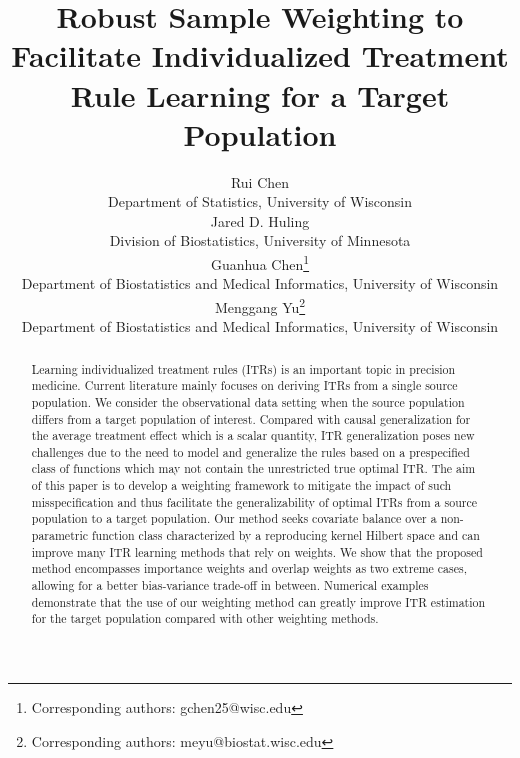 \documentclass[12pt]{article}
\begin{document}
	
	
	\def\spacingset#1{\renewcommand{\baselinestretch}%
		{#1}\small\normalsize} \spacingset{1}
	

		\title{\bf Robust Sample Weighting to Facilitate Individualized Treatment Rule Learning for a Target Population}
		\author{Rui Chen
			\\
			Department of Statistics, University of Wisconsin\\
			Jared D. Huling \\
			Division of Biostatistics, University of Minnesota\\
			Guanhua Chen\thanks{Corresponding authors: gchen25@wisc.edu} \\ 
			Department of Biostatistics and Medical Informatics, University of Wisconsin\\
			Menggang Yu\thanks{Corresponding authors: meyu@biostat.wisc.edu} \\
			Department of Biostatistics and Medical Informatics, University of Wisconsin\\
		}
		\maketitle

	


\bigskip
\begin{abstract}
Learning individualized treatment rules (ITRs) is an important topic in precision medicine. Current literature mainly focuses on deriving ITRs from a single source population. We consider the observational data setting when the source population differs from a target population of interest. Compared with causal generalization for the average treatment effect which is a scalar quantity, ITR generalization poses new challenges due to the need to model and generalize the rules based on a prespecified class of functions which may not contain the unrestricted true optimal ITR. The aim of this paper is to develop a weighting framework to mitigate the impact of such misspecification and thus facilitate the generalizability of optimal ITRs from a source population to a target population. Our method seeks covariate balance over a non-parametric function class characterized by a reproducing kernel Hilbert space and can improve many ITR learning methods that rely on weights. We show that the proposed method encompasses importance weights and overlap weights as two extreme cases, allowing for a better bias-variance trade-off in between. Numerical examples demonstrate that the use of our weighting method can greatly improve ITR estimation for the target population compared with other weighting methods.
\end{abstract}
\end{document}
